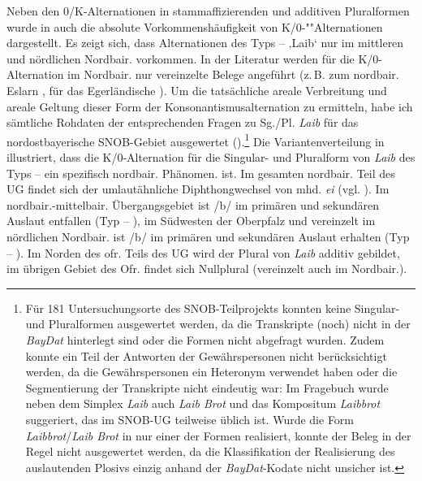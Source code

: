 Neben den 0/K-Alternationen in stammaffizierenden und additiven Pluralformen wurde in  auch die absolute Vorkommenshäufigkeit von K/0-""Al\-ter\-na\-tio\-nen dargestellt. Es zeigt sich, dass Alternationen des Typs  --  ‚Laib‘ nur im mittleren und nördlichen Nordbair. vorkommen. In der Literatur werden für die K/0-Alternation im Nordbair. nur vereinzelte Belege angeführt (z.\,B. zum nordbair. Eslarn \citealt[86]{Bachmann2000}, für das Egerländische \citealt[122]{Roth1940}). Um die tatsächliche areale Verbreitung und areale Geltung dieser Form der Konsonantismusalternation zu ermitteln, habe ich sämtliche Rohdaten der entsprechenden Fragen zu Sg./Pl. \textit{Laib} für das nordostbayerische SNOB-Gebiet ausgewertet ().\footnote{\textrm{Für 181 Untersuchungsorte des SNOB-Teilprojekts konnten keine Singular- und Pluralformen ausgewertet werden, da die Transkripte (noch) nicht in der} \textrm{\textit{BayDat}} \textrm{hinterlegt sind oder die Formen nicht abgefragt wurden. Zudem konnte ein Teil der Antworten der Gewährspersonen nicht berücksichtigt werden, da die Gewährspersonen ein Heteronym verwendet haben oder die Segmentierung der Transkripte nicht eindeutig war: Im Fragebuch wurde neben dem Simplex} \textrm{\textit{Laib}} \textrm{auch} \textrm{\textit{Laib Brot}} \textrm{und das Kompositum} \textrm{\textit{Laibbrot}} \textrm{suggeriert, das im SNOB-UG teilweise üblich ist. Wurde die Form} \textrm{\textit{Laibbrot}}\textrm{/}\textrm{\textit{Laib Brot}} \textrm{in nur einer der Formen realisiert, konnte der Beleg in der Regel nicht ausgewertet werden, da die Klassifikation der Realisierung des auslautenden Plosivs einzig anhand der} \textrm{\textit{BayDat}}\textrm{{}-Kodate nicht unsicher ist.}} Die Variantenverteilung in  illustriert, dass die K/0-Alternation für die Singular- und Pluralform von \textit{Laib} des Typs  --  ein spezifisch nordbair. Phänomen. ist. Im gesamten nordbair. Teil des UG findet sich der umlautähnliche Diphthongwechsel von mhd. \textit{ei} (vgl. ). Im nordbair.-mittelbair. Übergangsgebiet ist /b/ im primären und sekundären Auslaut entfallen (Typ  -- ), im Südwesten der Oberpfalz und vereinzelt im nördlichen Nordbair. ist /b/ im primären und sekundären Auslaut erhalten (Typ  -- ). Im Norden des ofr. Teils des UG wird der Plural von \textit{Laib} additiv gebildet, im übrigen Gebiet des Ofr. findet sich Nullplural (vereinzelt auch im Nordbair.).

